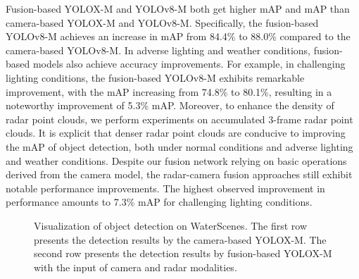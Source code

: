 \documentclass[lettersize,journal]{IEEEtran}
\begin{document}
Fusion-based YOLOX-M and YOLOv8-M both get higher mAP and mAP than camera-based YOLOX-M and YOLOv8-M. Specifically, the fusion-based YOLOv8-M achieves an increase in mAP from 84.4\% to 88.0\% compared to the camera-based YOLOv8-M. 
In adverse lighting and weather conditions, fusion-based models also achieve accuracy improvements. For example, in challenging lighting conditions, the fusion-based YOLOv8-M exhibits remarkable improvement, with the mAP increasing from 74.8\% to 80.1\%, resulting in a noteworthy improvement of 5.3\% mAP.
Moreover, to enhance the density of radar point clouds, we perform experiments on accumulated 3-frame radar point clouds. It is explicit that denser radar point clouds are conducive to improving the mAP of object detection, both under normal conditions and adverse lighting and weather conditions. Despite our fusion network relying on basic operations derived from the camera model, the radar-camera fusion approaches still exhibit notable performance improvements. The highest observed improvement in performance amounts to 7.3\% mAP for challenging lighting conditions.


\begin{figure}[htbp]
\centering
{}
\quad
\hspace{-6.6mm}
\quad
\hspace{-6.6mm}
\vspace{-2mm}
\centering
{}
\quad
\hspace{-6.6mm}
\quad
\hspace{-6.6mm}
\caption{Visualization of object detection on WaterScenes. The first row presents the detection results by the camera-based YOLOX-M. The second row presents the detection results by fusion-based YOLOX-M with the input of camera and radar modalities.}
\label{fig:object-detection-figures}
\end{figure}
\end{document}
